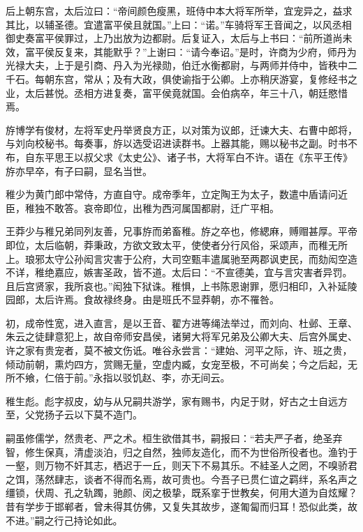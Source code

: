 \documentclass[]{article}
\begin{document}
后上朝东宫，太后泣曰：``帝间颜色瘦黑，班侍中本大将军所举，宜宠异之，益求其比，以辅圣德。宜遣富平侯且就国。''上曰：``诺。''车骑将军王音闻之，以风丞相御史奏富平侯罪过，上乃出放为边都尉。后复证入，太后与上书曰：``前所道尚未效，富平侯反复来，其能默乎？''上谢曰：``请今奉诏。''是时，许商为少府，师丹为光禄大夫，上于是引商、丹入为光禄勋，伯迁水衡都尉，与两师并侍中，皆秩中二千石。每朝东宫，常从；及有大政，俱使谕指于公卿。上亦稍厌游宴，复修经书之业，太后甚悦。丞相方进复奏，富平侯竟就国。会伯病卒，年三十八，朝廷愍惜焉。

斿博学有俊材，左将军史丹举贤良方正，以对策为议郎，迁谏大夫、右曹中郎将，与刘向校秘书。每奏事，斿以选受诏进读群书。上器其能，赐以秘书之副。时书不布，自东平思王以叔父求《太史公》、诸子书，大将军白不许。语在《东平王传》斿亦早卒，有子曰嗣，显名当世。

稚少为黄门郎中常侍，方直自守。成帝季年，立定陶王为太子，数遣中盾请问近臣，稚独不敢答。哀帝即位，出稚为西河属国都尉，迁广平相。

王莽少与稚兄弟同列友善，兄事斿而弟畜稚。斿之卒也，修緦麻，赙赗甚厚。平帝即位，太后临朝，莽秉政，方欲文致太平，使使者分行风俗，采颂声，而稚无所上。琅邪太守公孙闳言灾害于公府，大司空甄丰遣属驰至两郡讽吏民，而劾闳空造不详，稚绝嘉应，嫉害圣政，皆不道。太后曰：``不宣德美，宜与言灾害者异罚。且后宫贤家，我所哀也。''闳独下狱诛。稚惧，上书陈恩谢罪，愿归相印，入补延陵园郎，太后许焉。食故禄终身。由是班氏不显莽朝，亦不罹咎。

初，成帝性宽，进入直言，是以王音、翟方进等绳法举过，而刘向、杜邺、王章、朱云之徒肆意犯上，故自帝师安昌侯，诸舅大将军兄弟及公卿大夫、后宫外属史、许之家有贵宠者，莫不被文伤诋。唯谷永尝言：``建始、河平之际，许、班之贵，倾动前朝，熏灼四方，赏赐无量，空虚内臧，女宠至极，不可尚矣；今之后起，无所不飨，仁倍于前。''永指以驳饥赵、李，亦无间云。

稚生彪。彪字叔皮，幼与从兄嗣共游学，家有赐书，内足于财，好古之士自远方至，父党扬子云以下莫不造门。

嗣虽修儒学，然贵老、严之术。桓生欲借其书，嗣报曰：``若夫严子者，绝圣弃智，修生保真，清虚淡泊，归之自然，独师友造化，而不为世俗所役者也。渔钓于一壑，则万物不奸其志，栖迟于一丘，则天下不易其乐。不絓圣人之罔，不嗅骄君之饵，荡然肆志，谈者不得而名焉，故可贵也。今吾子已贯仁谊之羁绊，系名声之缰锁，伏周、孔之轨躅，驰颜、闵之极挚，既系挛于世教矣，何用大道为自炫耀？昔有学步于邯郸者，曾未得其仿佛，又复失其故步，遂匍匐而归耳！恐似此类，故不进。''嗣之行己持论如此。
\end{document}
